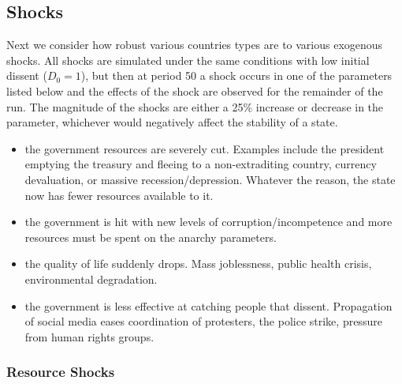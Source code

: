 \documentclass[12pt]{article}
\begin{document}
\begin{spacing}{1.5}


\subsection{Shocks}


Next we consider how robust various countries types are to various exogenous shocks. All shocks are simulated under the same conditions with low initial dissent ($D_0 = 1$), but then at period 50 a shock occurs in one of the parameters listed below and the effects of the shock are observed for the remainder of the run. The magnitude of the shocks are either a 25\% increase or decrease in the parameter, whichever would negatively affect the stability of a state.  

\begin{itemize}
	\item {} the government resources are severely cut. Examples include the president emptying the treasury and fleeing to a non-extraditing country, currency devaluation, or massive recession/depression. Whatever the reason, the state now has fewer resources available to it.  
	\item \boldmath{$\Omega,\Phi$:} the government is hit with new levels of corruption/incompetence and more resources must be spent on the anarchy parameters. 
	\item {} the quality of life suddenly drops. Mass joblessness, public health crisis, environmental degradation. 
	\item \boldmath{$\sigma$:} the government is less effective at catching people that dissent. Propagation of social media eases coordination of protesters, the police strike, pressure from human rights groups.     
\end{itemize}

\subsubsection{Resource Shocks} 


\end{spacing}
\end{document}
